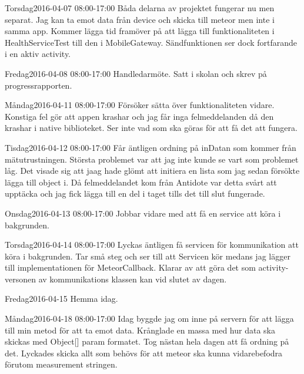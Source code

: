 \documentclass[a4paper,oneside]{book}
\begin{document}
\begin{diary}{Torsdag}{2016-04-07 08:00-17:00}
	Båda delarna av projektet fungerar nu men separat. Jag kan ta emot data från device och skicka till meteor men inte i samma app. Kommer lägga tid framöver på att lägga till funktionaliteten i HealthServiceTest till den i MobileGateway. Sändfunktionen ser dock fortfarande i en aktiv activity.
\end{diary}

\begin{diary}{Fredag}{2016-04-08 08:00-17:00}
	Handledarmöte. Satt i skolan och skrev på progressrapporten.
\end{diary}

\begin{diary}{Måndag}{2016-04-11 08:00-17:00}
	Försöker sätta över funktionaliteten vidare. Konstiga fel gör att appen krashar och jag får inga felmeddelanden då den krashar i native biblioteket. Ser inte vad som ska göras för att få det att fungera.
\end{diary}

\begin{diary}{Tisdag}{2016-04-12 08:00-17:00}
	Får äntligen ordning på inDatan som kommer från mätutrustningen. Största problemet var att jag inte kunde se vart som problemet låg. Det visade sig att jaag hade glömt att initiera en lista som jag sedan försökte lägga till object i. Då felmeddelandet kom från Antidote var detta svårt att upptäcka och jag fick lägga till en del i taget tills det till slut fungerade.
\end{diary}

\begin{diary}{Onsdag}{2016-04-13 08:00-17:00}
	Jobbar vidare med att få en service att köra i bakgrunden. 
\end{diary}

\begin{diary}{Torsdag}{2016-04-14 08:00-17:00}
	Lyckas äntligen få servicen för kommunikation att köra i bakgrunden. Tar små steg och ser till att Servicen kör medans jag lägger till implementationen för MeteorCallback. Klarar av att göra det som activity-versonen av kommunikations klassen kan vid slutet av dagen.
\end{diary}

\begin{diary}{Fredag}{2016-04-15}
	Hemma idag.
\end{diary}
\newpage

\begin{diary}{Måndag}{2016-04-18 08:00-17:00}
	Idag byggde jag om inne på servern för att lägga till min metod för att ta emot data. Krånglade en massa med hur data ska skickas med Object[] param formatet. Tog nästan hela dagen att få ordning på det. Lyckades skicka allt som behövs för att meteor ska kunna vidarebefodra förutom measurement stringen.
\end{diary}
\end{document}
